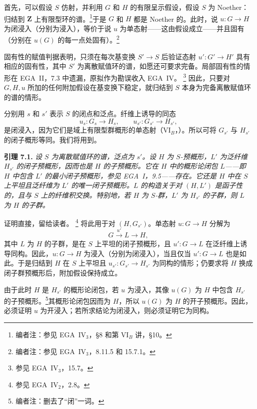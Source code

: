 首先，可以假设 \(S\) 仿射，并利用 \(G\) 和 \(H\) 的有限呈示假设，假设 \(S\) 为 Noether：归结到 \(\mathbf Z\) 上有限型环的谱。\footnote{编者注：参见 EGA~IV\(_3\)，§8 和第 VI\(_B\) 讲，§10。}于是 \(G\) 和 \(H\) 都是 Noether 的。此时，说 \(u:G\to H\) 为闭浸入（分别为浸入），等价于说 \(u\) 为单态射——这由假设成立——并且固有（分别在 \(u(G)\) 的每一点处固有）。\footnote{编者注：参见 EGA~IV\(_3\)，8.11.5 和 15.7.1。}

固有性的赋值判据表明，只须在每次基变换 \(S'\to S\) 后验证态射 \(u':G'\to H'\) 具有相应的固有性，其中 \(S'\) 为离散赋值环的谱，如愿还可要求完备。局部固有性的情形在 EGA~II，7.3 中遗漏，原拟作为勘误收入 EGA~IV。\begingroup
\renewcommand{\thefootnote}{(\(\ast\))}%
\footnote[0]{参见 EGA~IV\(_3\)，15.7。}%
\endgroup
因此，只要对 \(G,H,u\) 所加的任何附加假设在基变换下稳定，就归结到 \(S\) 本身为完备离散赋值环的谱的情形。

分别用 \(s\) 和 \(s'\) 表示 \(S\) 的闭点和泛点。纤维上诱导的同态
\[
  u_s:G_s\longrightarrow H_s,
  \qquad
  u_{s'}:G_{s'}\longrightarrow H_{s'},
\]
是闭浸入，因为它们是域上有限型群概形的单态射（VI\(_B\)，）。所以可将 \(G_{s'}\) 与 \(H_{s'}\) 的闭子概形等同。我们将用到。

\medskip
\noindent{}\textbf{引理 7.1.}
\textit{设 \(S\) 为离散赋值环的谱，泛点为 \(s'\)。设 \(H\) 为 \(S\)-预概形，\(L'\) 为泛纤维 \(H_{s'}\) 的闭子预概形，因而也是 \(H\) 的子预概形。它在 \(H\) 中的概形论闭包 \(L\)——即 \(H\) 中包含 \(L'\) 的最小闭子预概形，参见 EGA~I，9.5——存在。它还是 \(H\) 中在 \(S\) 上平坦且泛纤维为 \(L'\) 的唯一闭子预概形。\(L\) 的构造关于对 \((H,L')\) 是函子性的，且与 \(S\) 上的纤维积交换。特别地，若 \(H\) 为 \(S\)-群，\(L'\) 为 \(H_{s'}\) 的子群，则 \(L\) 为 \(H\) 的子群。}

证明直接，留给读者。\begingroup
\renewcommand{\thefootnote}{(\(\ast\ast\))}%
\footnote[0]{参见 EGA~IV\(_2\)，2.8。}%
\endgroup
将此用于对 \((H,G_{s'})\)。单态射 \(u:G\to H\) 分解为
\[
  G\xrightarrow{\,u'\,}L\longrightarrow H,
\]
其中 \(L\) 为 \(H\) 的子群，是在 \(S\) 上平坦的闭子预概形，且 \(u':G\to L\) 在泛纤维上诱导同构。因此，\(u:G\to H\) 为浸入（分别为闭浸入），当且仅当 \(u':G\to L\) 也是如此。于是归结到 \(H\) 在 \(S\) 上平坦且 \(u_{s'}:G_{s'}\to H_{s'}\) 为同构的情形；仍要求将 \(H\) 换成闭子群预概形后，附加假设保持成立。

由于此时 \(H\) 是 \(H_{s'}\) 的概形论闭包，若 \(u\) 为浸入，其像 \(u(G)\) 为 \(H\) 中包含 \(H_{s'}\) 的子预概形。\footnote{编者注：删去了“闭”一词。}其概形论闭包因而为 \(H\)，所以 \(u(G)\) 为 \(H\) 的开子预概形。因此，必须证明 \(u\) 为开浸入；若所求结论为闭浸入，则必须证明它为同构。


